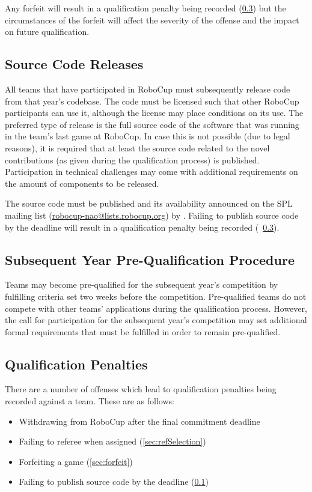 Any forfeit will result in a qualification penalty being recorded (\cf \cref{sec:qualificationPenalties}) but the circumstances of the forfeit will affect the severity of the offense and the impact on future qualification.

\subsection{Source Code Releases}
\label{sec:source_code_releases}

All teams that have participated in RoboCup must subsequently release code from that year's codebase.
The code must be licensed such that other RoboCup participants can use it, although the license may place conditions on its use.
The preferred type of release is the full source code of the software that was running in the team's last game at RoboCup.
In case this is not possible (\eg due to legal reasons), it is required that at least the source code related to the novel contributions (as given during the qualification process) is published.
Participation in technical challenges may come with additional requirements on the amount of components to be released.

The source code must be published and its availability announced on the SPL mailing list (\url{robocup-nao@lists.robocup.org}) by \DTMdate{\CodeReleaseAnnouncementDate}.
Failing to publish source code by the deadline will result in a qualification penalty being recorded (\cf~\cref{sec:qualificationPenalties}).

\subsection{Subsequent Year Pre-Qualification Procedure}
\label{sec:preQual}

Teams may become pre-qualified for the subsequent year's competition by fulfilling criteria set two weeks before the competition.
Pre-qualified teams do not compete with other teams' applications during the qualification process.
However, the call for participation for the subsequent year's competition may set additional formal requirements that must be fulfilled in order to remain pre-qualified.

\subsection{Qualification Penalties}
\label{sec:qualificationPenalties}

There are a number of offenses which lead to qualification penalties being recorded against a team. These are as follows:
\begin{itemize}
    \item Withdrawing from RoboCup after the final commitment deadline
    \item Failing to referee when assigned (\cref{sec:refSelection})
    \item Forfeiting a game (\cref{sec:forfeit})
    \item Failing to publish source code by the deadline (\cref{sec:source_code_releases})
\end{itemize}

